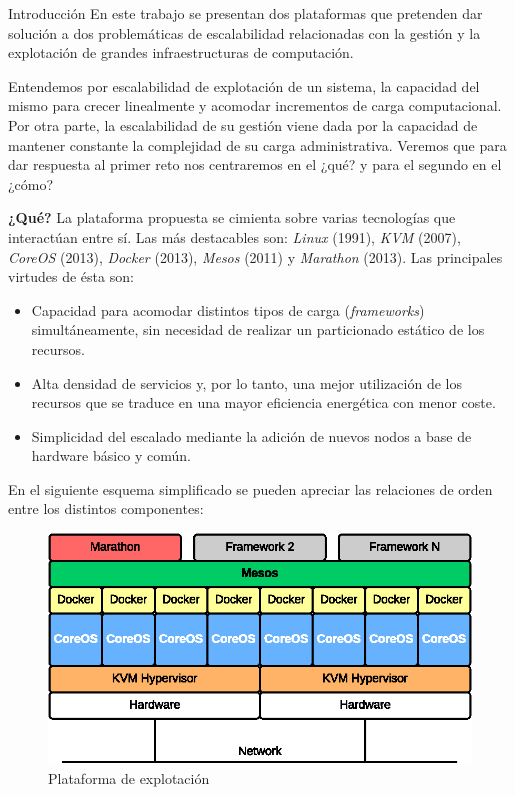 \documentclass[a4paper,12pt,spanish,final]{epsc_tfc_pfc}
\begin{document}
\begin{intro}{Introducción}
En este trabajo se presentan dos plataformas que pretenden dar solución a dos problemáticas de escalabilidad relacionadas con la gestión y la explotación de grandes infraestructuras de computación.

Entendemos por escalabilidad de explotación de un sistema, la capacidad del mismo para crecer linealmente y acomodar incrementos de carga computacional. Por otra parte, la escalabilidad de su gestión viene dada por la capacidad de mantener constante la complejidad de su carga administrativa. Veremos que para dar respuesta al primer reto nos centraremos en el ¿qué? y para el segundo en el ¿cómo?

\textbf{¿Qué?} La plataforma propuesta se cimienta sobre varias tecnologías que interactúan entre sí. Las más destacables son: \emph{Linux} (1991), \emph{KVM} (2007), \emph{CoreOS} (2013), \emph{Docker} (2013), \emph{Mesos} (2011) y \emph{Marathon} (2013). Las principales virtudes de ésta son:
\begin{itemize}
  \item Capacidad para acomodar distintos tipos de carga (\emph{frameworks}) simultáneamente, sin necesidad de realizar un particionado estático de los recursos.
  \item Alta densidad de servicios y, por lo tanto, una mejor utilización de los recursos que se traduce en una mayor eficiencia energética con menor coste.
  \item Simplicidad del escalado mediante la adición de nuevos nodos a base de hardware básico y común.
\end{itemize}

En el siguiente esquema simplificado se pueden apreciar las relaciones de orden entre los distintos componentes:\\

\begin{figure}[h]
  \centering
    \includegraphics[scale=1]{plataforma}
      \caption{Plataforma de explotación}
\end{figure}


\end{intro}
\end{document}
